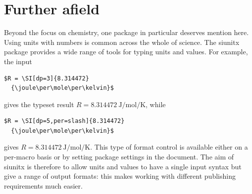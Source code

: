 \documentclass{article}
\providecommand*\pkg[1]{\textsf{#1}}
\begin{document}
\section{Further afield}

Beyond the focus on chemistry, one package in particular
deserves mention here.  Using units with numbers is common
across the whole of science.  The \pkg{siunitx} package
provides a wide range of tools for typing units and values. For
example, the input
\begin{verbatim}
$R = \SI[dp=3]{8.314472}
  {\joule\per\mole\per\kelvin}$
\end{verbatim}
gives the typeset result $R = \SI [dp=3] {8.314472}
{\joule\per\mole\per\kelvin}$, while
\begin{verbatim}
$R = \SI[dp=5,per=slash]{8.314472}
  {\joule\per\mole\per\kelvin}$
\end{verbatim}
gives $R = \SI [dp=5,per=slash] {8.314472}
{\joule\per\mole\per\kelvin}$.  This type of format control is
available either on a per-macro basis or by setting package
settings in the document.  The aim of \pkg{siunitx} is
therefore to allow units and values to have a single input
syntax but give a range of output formats: this makes working
with different publishing requirements much easier.



\end{document}
